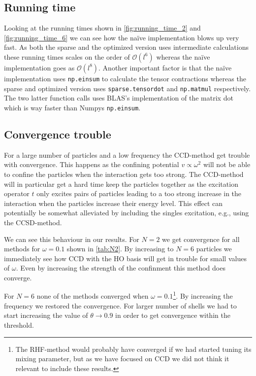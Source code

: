 \documentclass[
    a4paper, aps, twocolumn, floatfix, superscriptaddress,
    nofootinbib]{revtex4-1}
\newcommand{\1}{\mathds{1}}
\begin{document}
    \subsection{Running time}
        Looking at the running times shown in \autoref{fig:running_time_2} and
        \autoref{fig:running_time_6} we can see how the naïve implementation
        blows up very fast. As both the sparse and the optimized version uses
        intermediate calculations these running times scales on the order of
        $\mathcal{O}(l^6)$ whereas the naïve implementation goes as
        $\mathcal{O}(l^8)$. Another important factor is that the naïve
        implementation uses \texttt{np.einsum} to calculate the tensor
        contractions whereas the sparse and optimized version uses
        \texttt{sparse.tensordot} and \texttt{np.matmul} respectively. The two
        latter function calls uses BLAS's implementation of the matrix dot which
        is way faster than Numpys \texttt{np.einsum}.

    \subsection{Convergence trouble}
        For a large number of particles and a low frequency the CCD-method get
        trouble with convergence. This happens as the confining potential $v
        \propto \omega^2$ will not be able to confine the particles when the
        interaction gets too strong. The CCD-method will in particular get a
        hard time keep the particles together as the excitation operator $t$
        only excites pairs of particles leading to a too strong increase in the
        interaction when the particles increase their energy level. This effect
        can potentially be somewhat alleviated by including the singles
        excitation, e.g., using the CCSD-method.

        We can see this behaviour in our results. For $N = 2$ we get convergence
        for all methods for $\omega = 0.1$ shown in \autoref{tab:N2}. By
        increasing to $N = 6$ particles we immediately see how CCD with the HO
        basis will get in trouble for small values of $\omega$. Even by increasing
        the strength of the confinment this method does converge.

        For $N = 6$ none of the methods converged when $\omega =
        0.1$\footnote{The RHF-method would probably have converged if we had
        started tuning its mixing parameter, but as we have focused on CCD we did
        not think it relevant to include these results.}. By increasing the
        frequency we restored the convergence. For larger number of shells we
        had to start increasing the value of $\theta \to 0.9$ in order to get
        convergence within the threshold.
\end{document}

